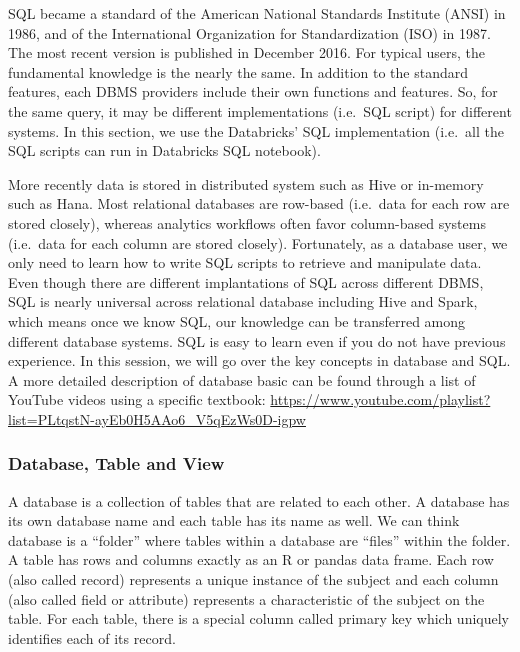 \documentclass[
]{article}
\begin{document}
SQL became a standard of the American National Standards Institute
(ANSI) in 1986, and of the International Organization for
Standardization (ISO) in 1987. The most recent version is published in
December 2016. For typical users, the fundamental knowledge is the
nearly the same. In addition to the standard features, each DBMS
providers include their own functions and features. So, for the same
query, it may be different implementations (i.e.~SQL script) for
different systems. In this section, we use the Databricks' SQL
implementation (i.e.~all the SQL scripts can run in Databricks SQL
notebook).

More recently data is stored in distributed system such as Hive or
in-memory such as Hana. Most relational databases are row-based
(i.e.~data for each row are stored closely), whereas analytics workflows
often favor column-based systems (i.e.~data for each column are stored
closely). Fortunately, as a database user, we only need to learn how to
write SQL scripts to retrieve and manipulate data. Even though there are
different implantations of SQL across different DBMS, SQL is nearly
universal across relational database including Hive and Spark, which
means once we know SQL, our knowledge can be transferred among different
database systems. SQL is easy to learn even if you do not have previous
experience. In this session, we will go over the key concepts in
database and SQL. A more detailed description of database basic can be
found through a list of YouTube videos using a specific textbook:
\url{https://www.youtube.com/playlist?list=PLtqstN-ayEb0H5AAo6_V5qEzWs0D-igpw}

\hypertarget{database-table-and-view}{%
\subsubsection{Database, Table and View}\label{database-table-and-view}}

A database is a collection of tables that are related to each other. A
database has its own database name and each table has its name as well.
We can think database is a ``folder'' where tables within a database are
``files'' within the folder. A table has rows and columns exactly as an
R or pandas data frame. Each row (also called record) represents a
unique instance of the subject and each column (also called field or
attribute) represents a characteristic of the subject on the table. For
each table, there is a special column called primary key which uniquely
identifies each of its record.
\end{document}
